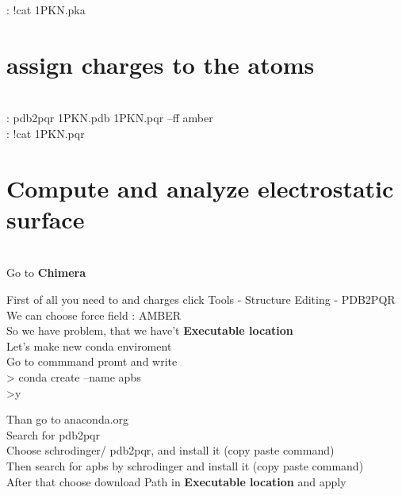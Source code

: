 \documentclass{article}
\begin{document}
: !cat 1PKN.pka









\section{assign charges to the atoms} \\

: pdb2pqr 1PKN.pdb 1PKN.pqr --ff amber \\

: !cat 1PKN.pqr \\







\section{Compute and analyze electrostatic surface} \\

Go to \textbf{Chimera}

First of all you need to and charges click Tools - Structure Editing - PDB2PQR \\

We can choose force field : AMBER \\

So we have problem, that we have't \textbf{Executable location} \\

Let's make new conda enviroment \\

Go to commmand promt and write \\

> conda create --name apbs \\
>y

Than go to anaconda.org \\

Search for pdb2pqr \\

Choose schrodinger/ pdb2pqr, and install it (copy paste command) \\

Then search for apbs by schrodinger and install it (copy paste command) \\

After that choose download Path in \textbf{Executable location} and apply \\
\end{document}

